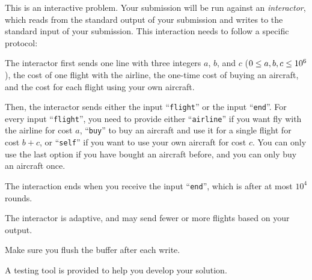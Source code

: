 \begin{Interaction}
    This is an interactive problem.
    Your submission will be run against an \emph{interactor},
    which reads from the standard output of your submission
    and writes to the standard input of your submission.
    This interaction needs to follow a specific protocol:

    The interactor first sends
    one line with three integers $a$, $b$, and $c$ ($0\leq a,b,c\leq 10^6$),
    the cost of one flight with the airline,
    the one-time cost of buying an aircraft, and
    the cost for each flight using your own aircraft.

    Then, the interactor sends either the input ``\texttt{flight}'' or the input ``\texttt{end}''.
    For every input ``\texttt{flight}'', you need to provide either
    ``\texttt{airline}'' if you want fly with the airline for cost $a$,
    ``\texttt{buy}'' to buy an aircraft and use it for a single flight for cost $b+c$, or
    ``\texttt{self}'' if you want to use your own aircraft for cost $c$.
    You can only use the last option if you have bought an aircraft before, and you can only buy an aircraft once.

    The interaction ends when you receive the input ``\texttt{end}'', which is after at most $10^4$ rounds.

    The interactor is adaptive, and may send fewer or more flights based on your output.

    Make sure you flush the buffer after each write.

    A testing tool is provided to help you develop your solution.
\end{Interaction}
